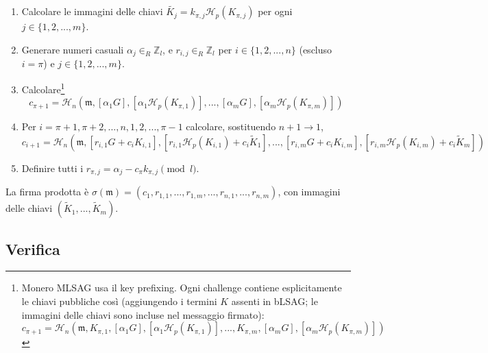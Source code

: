 \begin{enumerate}
	\item Calcolare le immagini delle chiavi \(\tilde{K_j} = k_{\pi, j} \mathcal{H}_p(K_{\pi, j})\) per ogni \(j \in \{1, 2, ..., m\}\).

	\item Generare numeri casuali  \(\alpha_j \in_R \mathbb{Z}_l\), e \(r_{i, j} \in_R \mathbb{Z}_l\) per \(i \in \{1, 2, ..., n\}\) (escluso \(i = \pi\)) e \(j \in \{1, 2, ..., m\}\).

	\item Calcolare\footnote{Monero MLSAG usa il key prefixing. Ogni challenge contiene esplicitamente le chiavi pubbliche così (aggiungendo i termini $K$ assenti in bLSAG; le immagini delle chiavi sono incluse nel messaggio firmato):\vspace{-.25cm}
	\[c_{\pi+1} = \mathcal{H}_n(\mathfrak{m}, K_{\pi, 1}, [\alpha_1 G], [\alpha_1 \mathcal{H}_p(K_{\pi, 1})], ..., K_{\pi, m}, [\alpha_m G], [\alpha_m \mathcal{H}_p(K_{\pi, m})])
	\]}
	\[c_{\pi+1} = \mathcal{H}_n(\mathfrak{m}, [\alpha_1 G], [\alpha_1 \mathcal{H}_p(K_{\pi, 1})], ..., [\alpha_m G], [\alpha_m \mathcal{H}_p(K_{\pi, m})])\]

	\item Per \(i = \pi+1, \pi+2, ..., n, 1, 2, ..., \pi-1\) calcolare, sostituendo \(n + 1 \rightarrow 1\),\vspace{.175cm}
	\[ c_{i+1} = \mathcal{H}_n(\mathfrak{m}, [r_{i, 1} G + c_i K_{i, 1}], [r_{i, 1} \mathcal{H}_p(K_{i, 1}) + c_i \tilde{K}_1], 
	..., [r_{i, m} G + c_i K_{i, m}], [r_{i, m} \mathcal{H}_p(K_{i, m}) + c_i \tilde{K}_m])\]

	\item Definire tutti i \(r_{\pi, j} = \alpha_j - c_\pi k_{\pi, j} \pmod l\).
\end{enumerate}

La firma prodotta è \(\sigma(\mathfrak{m}) = (c_1, r_{1, 1}, ..., r_{1, m}, ..., r_{n, 1}, ..., r_{n, m}) \), con immagini delle chiavi $(\tilde{K}_1, ...,  \tilde{K}_m)$.



\subsection*{Verifica}

